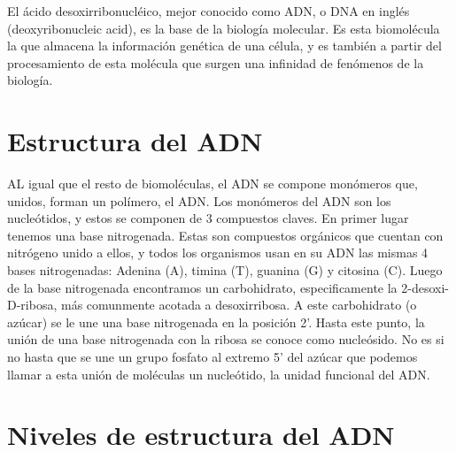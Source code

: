 
El ácido desoxirribonucléico, mejor conocido como ADN, o DNA en inglés (deoxyribonucleic acid), es la base de la biología molecular. Es esta biomolécula la que almacena la información genética de una célula, y es también a partir del procesamiento de esta molécula que surgen una infinidad de fenómenos de la biología. 

\section{Estructura del ADN}

AL igual que el resto de biomoléculas, el ADN se compone monómeros que, unidos, forman un polímero, el ADN. Los monómeros del ADN son los nucleótidos, y estos se componen de 3 compuestos claves. En primer lugar tenemos una base nitrogenada. Estas son compuestos orgánicos que cuentan con nitrógeno unido a ellos, y todos los organismos usan en su ADN las mismas 4 bases nitrogenadas: Adenina (A), timina (T), guanina (G) y citosina (C). Luego de la base nitrogenada encontramos un carbohidrato, especificamente la 2-desoxi-D-ribosa, más comunmente acotada a desoxirribosa. A este carbohidrato (o azúcar) se le une una base nitrogenada en la posición 2'.  Hasta este punto, la unión de una base nitrogenada con la ribosa se conoce como nucleósido. No es si no hasta que se une un grupo fosfato al extremo 5' del azúcar que podemos llamar a esta unión de moléculas un nucleótido, la unidad funcional del ADN.\cite{pinillabermudezBiologiaMolecular2019}

\section{Niveles de estructura del ADN}



